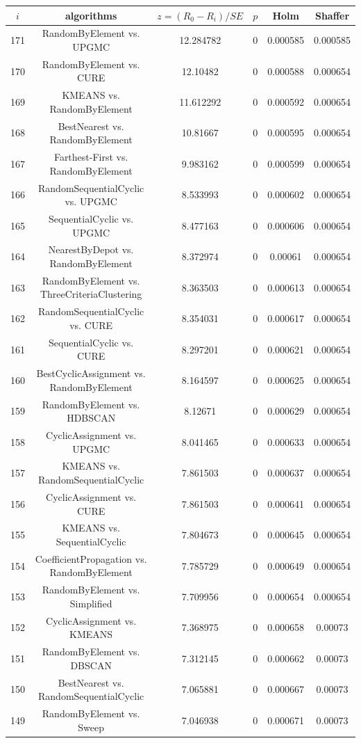 \documentclass[a4paper,10pt]{article}
\begin{document}
\begin{landscape}
\begin{table}[!htp]
\centering\scriptsize
\begin{tabular}{cccccc}
$i$&algorithms&$z=(R_0 - R_i)/SE$&$p$&Holm&Shaffer\\
\hline171&RandomByElement vs. UPGMC&12.284782&0&0.000585&0.000585\\
170&RandomByElement vs. CURE&12.10482&0&0.000588&0.000654\\
169&KMEANS vs. RandomByElement&11.612292&0&0.000592&0.000654\\
168&BestNearest vs. RandomByElement&10.81667&0&0.000595&0.000654\\
167&Farthest-First vs. RandomByElement&9.983162&0&0.000599&0.000654\\
166&RandomSequentialCyclic vs. UPGMC&8.533993&0&0.000602&0.000654\\
165&SequentialCyclic vs. UPGMC&8.477163&0&0.000606&0.000654\\
164&NearestByDepot vs. RandomByElement&8.372974&0&0.00061&0.000654\\
163&RandomByElement vs. ThreeCriteriaClustering&8.363503&0&0.000613&0.000654\\
162&RandomSequentialCyclic vs. CURE&8.354031&0&0.000617&0.000654\\
161&SequentialCyclic vs. CURE&8.297201&0&0.000621&0.000654\\
160&BestCyclicAssignment vs. RandomByElement&8.164597&0&0.000625&0.000654\\
159&RandomByElement vs. HDBSCAN&8.12671&0&0.000629&0.000654\\
158&CyclicAssignment vs. UPGMC&8.041465&0&0.000633&0.000654\\
157&KMEANS vs. RandomSequentialCyclic&7.861503&0&0.000637&0.000654\\
156&CyclicAssignment vs. CURE&7.861503&0&0.000641&0.000654\\
155&KMEANS vs. SequentialCyclic&7.804673&0&0.000645&0.000654\\
154&CoefficientPropagation vs. RandomByElement&7.785729&0&0.000649&0.000654\\
153&RandomByElement vs. Simplified&7.709956&0&0.000654&0.000654\\
152&CyclicAssignment vs. KMEANS&7.368975&0&0.000658&0.00073\\
151&RandomByElement vs. DBSCAN&7.312145&0&0.000662&0.00073\\
150&BestNearest vs. RandomSequentialCyclic&7.065881&0&0.000667&0.00073\\
149&RandomByElement vs. Sweep&7.046938&0&0.000671&0.00073\\

\end{tabular}
\end{table}
\end{landscape}
\end{document}
